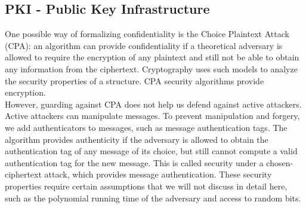 \subsection{PKI - Public Key Infrastructure}
One possible way of formalizing confidentiality is the Choice Plaintext Attack (CPA): 
an algorithm can provide confidentiality if a theoretical adversary is allowed to require 
the encryption of any plaintext and still not be able to obtain any information from the 
ciphertext\cite{b38}. Cryptography uses such models to analyze the security properties of a structure. 
CPA security algorithms provide encryption\cite{b31}.
\\
However, guarding against CPA does not help us defend against active attackers. Active 
attackers can manipulate messages. To prevent manipulation and forgery, we add authenticators 
to messages, such as message authentication tags\cite{b38}. The algorithm provides authenticity if 
the adversary is allowed to obtain the authentication tag of any message of its choice, 
but still cannot compute a valid authentication tag for the new message. This is called 
security under a chosen-ciphertext attack, which provides message authentication.
These security properties require certain assumptions that we will not discuss in detail 
here, such as the polynomial running time of the adversary and access to random bits.

